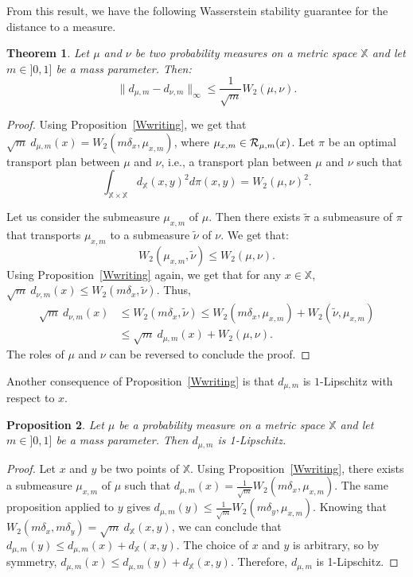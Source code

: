 \documentclass[a4paper]{article}
\newcommand\norm[1]{\|#1\|}
\newcommand\dm{d_{\mu,m}}
\newcommand\X{\mathbb{X}}
\newcommand\dX[2]{d_\X(#1,#2)}
\newtheorem{theorem}{Theorem}[section]
\newtheorem{proposition}[theorem]{Proposition}
\begin{document}
From this result, we have the following Wasserstein stability guarantee for the distance to a measure.

\begin{theorem}\label{stability}
Let $\mu$ and $\nu$ be two probability measures on a metric space $\X$ and let $m\in]0,1]$ be a mass parameter. 
Then:
$$\norm{\dm-d_{\nu,m}}_\infty\leq\frac{1}{\sqrt{m}}W_2(\mu,\nu).$$
\end{theorem}

\begin{proof}
Using Proposition~\ref{Wwriting}, we get that $\sqrt{m}\ \dm(x)=W_2(m\delta_x,\mu_{x,m})$, where $\mu_{x,m}\in {\cal R}_{\mu,m}(x)$. 
Let $\pi$ be an optimal transport plan between $\mu$ and $\nu$, i.e., a transport plan between $\mu$ and $\nu$ such that
\[
  \int_{\X\times\X}\dX{x}{y}^2d\pi(x,y)=W_2(\mu,\nu)^2.
\]

Let us consider the submeasure $\mu_{x,m}$ of $\mu$.
Then there exists $\tilde\pi$ a submeasure of $\pi$ that transports $\mu_{x,m}$ to a submeasure $\tilde\nu$ of $\nu$.
We get that:
$$W_2(\mu_{x,m},\tilde\nu)\leq W_2(\mu,\nu).$$
Using Proposition~\ref{Wwriting} again, we get that for any $x\in\X$, $\sqrt{m}\ d_{\nu,m}(x)\leq W_2(m\delta_x,\tilde\nu)$.
Thus,
\begin{align*}
\sqrt{m}\ d_{\nu,m}(x)
&\leq W_2(m\delta_x,\tilde\nu)\leq W_2(m\delta_x,\mu_{x,m})+W_2(\tilde\nu,\mu_{x,m})\\
&\leq \sqrt{m}\ \dm(x)+W_2(\mu,\nu).
\end{align*}
The roles of $\mu$ and $\nu$ can be reversed to conclude the proof.
\end{proof}

Another consequence of Proposition~\ref{Wwriting} is that $\dm$ is $1$-Lipschitz with respect to $x$.

\begin{proposition}\label{pLipschitz}
Let $\mu$ be a probability measure on a metric space $\X$ and let $m\in]0,1]$ be a mass parameter. Then $\dm$ is 1-Lipschitz.
\end{proposition}

\begin{proof}
Let $x$ and $y$ be two points of $\X$. 
Using Proposition~\ref{Wwriting}, there exists a submeasure $\mu_{x,m}$ of $\mu$ such that $\dm(x)=\frac{1}{\sqrt{m}}W_2(m\delta_x,\mu_{x,m})$.
The same proposition applied to $y$ gives $\dm(y)\leq \frac{1}{\sqrt{m}}W_2(m\delta_y,\mu_{x,m})$.
Knowing that $W_2(m\delta_x,m\delta_y)=\sqrt{m}\ \dX{x}{y}$, we can conclude that $\dm(y)\leq\dm(x)+\dX{x}{y}$.
The choice of $x$ and $y$ is arbitrary, so by symmetry, $\dm(x)\leq\dm(y)+\dX{x}{y}$.
Therefore, $\dm$ is 1-Lipschitz.
\end{proof}
\end{document}
